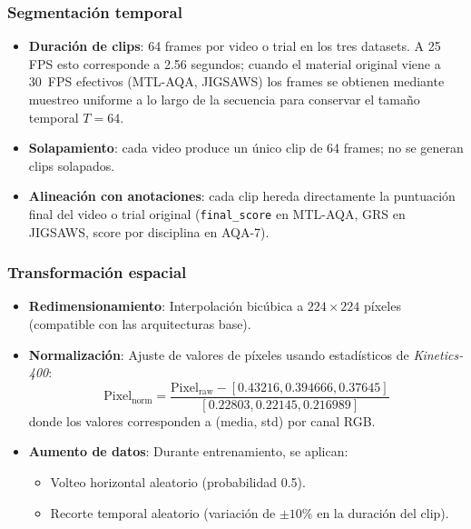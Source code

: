 \subsubsection{Segmentación temporal}
\begin{itemize}
    \item \textbf{Duración de clips}: 64 frames por video o trial en los tres datasets. A 25 FPS esto corresponde a 2.56 segundos; cuando el material original viene a 30~FPS efectivos (MTL-AQA, JIGSAWS) los frames se obtienen mediante muestreo uniforme a lo largo de la secuencia para conservar el tamaño temporal $T = 64$.
    \item \textbf{Solapamiento}: cada video produce un único clip de 64 frames; no se generan clips solapados.
    \item \textbf{Alineación con anotaciones}: cada clip hereda directamente la puntuación final del video o trial original (\texttt{final\_score} en MTL-AQA, GRS en JIGSAWS, score por disciplina en AQA-7).
\end{itemize}

\subsubsection{Transformación espacial}
\begin{itemize}
    \item \textbf{Redimensionamiento}: Interpolación bicúbica a $224 \times 224$ píxeles (compatible con las arquitecturas base).
    \item \textbf{Normalización}: Ajuste de valores de píxeles usando estadísticos de \textit{Kinetics-400}:
        \[
        \text{Pixel}_{\text{norm}} = \frac{\text{Pixel}_{\text{raw}} - [0.43216, 0.394666, 0.37645]}{[0.22803, 0.22145, 0.216989]}
        \]
        donde los valores corresponden a (media, std) por canal RGB.
    \item \textbf{Aumento de datos}: Durante entrenamiento, se aplican:
        \begin{itemize}
            \item Volteo horizontal aleatorio (probabilidad 0.5).
            \item Recorte temporal aleatorio (variación de $\pm10\%$ en la duración del clip).
        \end{itemize}
\end{itemize}

